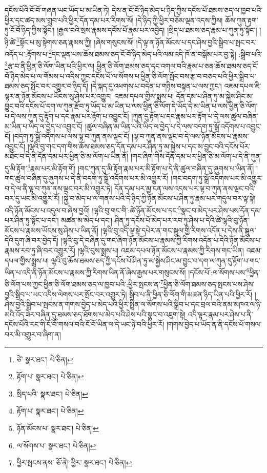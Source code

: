 དངོས་པོའི་ངོ་བོ་གཞན་ཡང་ཡོད་པ་མ་ཡིན་ཏེ། དེས་ན་ངོ་བོ་ཉིད་མེད་པ་ཉིད་ཀྱིས་དངོས་པོ་ཐམས་ཅད་ལ་ཁྱབ་པའི་ཕྱིར་དང་ཚད་མས་གྲུབ་པའི་ཕྱིར་དོན་དམ་པར་རིགས་སོ། །དེ་ཉིད་ཀྱི་ཕྱིར་བཅོམ་ལྡན་འདས་ཀྱིས། ཆོས་ཀུན་རྟག་ཏུ་ངོ་བོ་ཉིད་ཀྱིས་སྟོང་། །རྒྱལ་བའི་སྲས་རྣམས་དངོས་པོ་རྣམ་པར་འབྱེད། །སྲིད་པ་ཐམས་ཅད་རྣམ་པ་ཀུན་ཏུ་སྟོང་། །ཉི་ཚེ་\footnote{ཙེ་  སྣར་ཐང་།  པེ་ཅིན། }སྟོང་པ་མུ་སྟེགས་ཅན་རྣམས་ཀྱི། །ཞེས་གསུངས་སོ། །དེ་ལྟ་ན་ཉོན་མོངས་པ་དང་ཤེས་བྱའི་སྒྲིབ་པ་སྤང་བར་འདོད་པ་:རྟོགས་པ་\footnote{རྟོག་པ་  སྣར་ཐང་།  པེ་ཅིན། }དང་ལྡན་པས་ཆོས་ཐམས་ཅད་ངོ་བོ་ཉིད་མེད་པའི་ལམ་འདི་ཁོ་ན་བསྒོམ་པར་བྱ་སྟེ། :སྒྲིབ་པའི་\footnote{སྲིད་པའི་  སྣར་ཐང་།  པེ་ཅིན། }རྩ་བ་ནི་ཕྱིན་ཅི་ལོག་ཡིན་པའི་ཕྱིར་ལ། ཕྱིན་ཅི་ལོག་ཐམས་ཅད་དང་འགལ་བའི་རྣམ་པ་ཅན་ཆོས་ཐམས་ཅད་ངོ་བོ་ཉིད་མེད་པ་ལ་གོམས་པ་འདིས་ཀྱང་དངོས་པོ་ལ་སོགས་པ་ཕྱིན་ཅི་ལོག་སྤོང་བས་རྩ་བ་བཅད་པའི་ཕྱིར་སྒྲིབ་པ་ཐམས་ཅད་སྤོང་བར་འགྱུར་བ་ཉིད་དོ། །དེ་སྐད་དུ་འཕགས་པ་བདེན་པ་གཉིས་བསྟན་པ་ལས་ཀྱང་། འཇམ་དཔལ་ཇི་ལྟར་ན་ཉོན་མོངས་པ་ཡོངས་སུ་ཤེས་པར་འགྱུར། འཇམ་དཔལ་གྱིས་སྨྲས་པ། དོན་དམ་པ་ཤིན་ཏུ་མ་སྐྱེས་ཤིང་མ་བྱུང་བའི་དངོས་པོ་དག་ལ་ཀུན་རྫོབ་ཏུ་ཡོད་པ་མ་ཡིན་པ་ལས་ཕྱིན་ཅི་ལོག་དེ་ཡོད་དེ་མ་ཡིན་པ་ལས་ཕྱིན་ཅི་ལོག་པ་དེ་ལས་ཀུན་དུ་རྟོག་པ་དང་རྣམ་པར་རྟོག་པ་འབྱུང་ངོ། །ཀུན་དུ་རྟོག་པ་དང་རྣམ་པར་རྟོག་པ་དེ་ལས་ཚུལ་བཞིན་མ་ཡིན་པ་ཡིད་ལ་བྱེད་པ་འབྱུང་ངོ། །ཚུལ་བཞིན་མ་ཡིན་པའི་ཡིད་ལ་བྱེད་པ་དེ་ལས་བདག་ཏུ་སྒྲོ་འདོགས་པ་འབྱུང་ངོ། །བདག་ཏུ་སྒྲོ་འདོགས་པ་ལས་ལྟ་བ་ཀུན་ནས་ལྡང་ངོ། །ལྟ་བ་ཀུན་ནས་ལྡང་བ་དེ་ལས་ཉོན་མོངས་པ་རྣམས་འབྱུང་ངོ། །ལྷའི་བུ་གང་དག་གིས་ཆོས་ཐམས་ཅད་དོན་དམ་པར་ཤིན་ཏུ་མ་སྐྱེས་པ་དང་མ་བྱུང་བའི་དངོས་པོར་མཐོང་བ་དེ་ནི་དོན་དམ་པར་ཕྱིན་ཅི་མ་ལོག་པ་ཡིན་ནོ། །གང་ཞིག་གིས་དོན་དམ་པར་ཕྱིན་ཅི་མ་ལོག་པ་དེ་ནི་ཀུན་དུ་མི་རྟོག་\footnote{རྟོག་པ་  སྣར་ཐང་།  པེ་ཅིན། }རྣམ་པར་མི་རྟོག་གོ། །གང་ཀུན་དུ་མི་རྟོག་རྣམ་པར་མི་རྟོག་པ་དེ་ནི་ཚུལ་བཞིན་དུ་ཞུགས་པ་ཡིན་ནོ། །གང་ཚུལ་བཞིན་དུ་ཞུགས་པ་དེ་ནི་བདག་ཏུ་སྒྲོ་འདོགས་པར་མི་འགྱུར་རོ། །གང་བདག་ཏུ་སྒྲོ་འདོགས་པར་མི་འགྱུར་བ་དེ་ལ་ནི་ལྟ་བ་ཀུན་ནས་ལྡང་བར་མི་འགྱུར་ཏེ། དོན་དམ་པར་མྱ་ངན་ལས་འདས་པར་ལྟ་བ་ཀུན་ནས་ལྡང་བའི་བར་དུ་ཡང་མི་འགྱུར་རོ། །སྐྱེ་བ་མེད་པ་ལ་གནས་པའི་དེ་ཉིད་ཀྱི་ཉོན་མོངས་པ་ཤིན་ཏུ་རྣམ་པར་གདུལ་བར་ལྟ་སྟེ། འདི་ཉོན་མོངས་པ་འདུལ་བ་ཞེས་བྱའོ། །ལྷའི་བུ་གང་གི་:ཚེ་ཉོན་མོངས་པ་དང་\footnote{ཉོན་མོངས་པ་  སྣར་ཐང་།  པེ་ཅིན། }སྣང་བ་མེད་པར་ཤེས་པས་དོན་དམ་པར་ཤིན་ཏུ་སྟོང་པ་དང་། མཚན་མ་མེད་པ་དང་། ཤིན་ཏུ་དངོས་པོ་མེད་པར་རབ་ཏུ་ཤེས་པ་དེའི་ཚེ་ལྷའི་བུ་ཉོན་མོངས་པ་རྣམས་ཡོངས་སུ་ཤེས་པ་ཡིན་ནོ། །ལྷའི་བུ་འདི་ལྟ་སྟེ་དཔེར་ན་གང་སྦྲུལ་གྱི་རིགས་འདོན་པ་དེས་ནི་སྦྲུལ་དེའི་དུག་ཞི་བར་བྱེད་དོ། །ལྷའི་བུ་དེ་བཞིན་དུ་གང་ཞིག་ཉོན་མོངས་པ་རྣམས་ཀྱི་རིགས་འདོན་པ་དེའི་ཉོན་མོངས་པ་རྣམས་རབ་ཏུ་ཞི་བར་འགྱུར་རོ། །ལྷའི་བུས་སྨྲས་པ། འཇམ་དཔལ་ཉོན་མོངས་པ་རྣམས་ཀྱི་རིགས་གང་ཡིན། འཇམ་དཔལ་གྱིས་སྨྲས་པ། ལྷའི་བུ་ཆོས་ཐམས་ཅད་ཀྱི་དངོས་པོ་ཤིན་ཏུ་མ་སྐྱེས་ཤིང་མ་བྱུང་བ་དག་ལ་ཀུན་དུ་རྟོག་པ་གང་ཡིན་པ་འདི་ནི་ཉོན་མོངས་པ་རྣམས་ཀྱི་རིགས་ཡིན་ནོ་ཞེས་རྒྱས་པར་གསུངས་སོ། །དངོས་པོ་:ལ་སོགས་པས་\footnote{ལ་སོགས་པ་  སྣར་ཐང་།  པེ་ཅིན། }ཕྱིན་ཅི་ལོག་པས་ཀྱང་ཕྱིན་ཅི་ལོག་ཐམས་ཅད་ལ་ཁྱབ་པའི་:ཕྱིར་སྤངས་ན་\footnote{ཕྱིར་སྤངས་ནས་  ཅོ་ནེ། ཕྱིར་  སྣར་ཐང་།  པེ་ཅིན། }ཕྱིན་ཅི་ལོག་ཐམས་ཅད་སྤངས་པས་ཤེས་བྱའི་སྒྲིབ་པ་ཡང་འདིས་ལེགས་པར་སྤོང་བར་འགྱུར་ཏེ། སྒྲིབ་པ་ནི་ཕྱིན་ཅི་ལོག་གི་མཚན་ཉིད་ཡིན་པའི་ཕྱིར་རོ། །ཤེས་བྱའི་སྒྲིབ་པ་སྤངས་ན་གགས་བྱེད་པ་མེད་པའི་ཕྱིར་སྤྲིན་ལ་སོགས་པའི་སྒྲིབ་པ་དང་བྲལ་བའི་ནམ་མཁའ་ལ་ཉི་མའི་འོད་ཟེར་བཞིན་དུ་ཐམས་ཅད་ཐོགས་པ་མེད་པའི་ཤེས་པའི་སྣང་བ་འཇུག་སྟེ། འདི་ལྟར་རྣམ་པར་ཤེས་པ་ནི་དངོས་པོའི་རང་གི་ངོ་བོ་གསལ་བའི་ངོ་བོ་ཡིན་ལ་དེ་ཡང་ཉེ་བའི་ཕྱིར་རོ། །གགས་བྱེད་པ་ཡོད་ན་ནི་དངོས་པོ་གསལ་བར་མི་འགྱུར་བ་ཞིག་ན། 